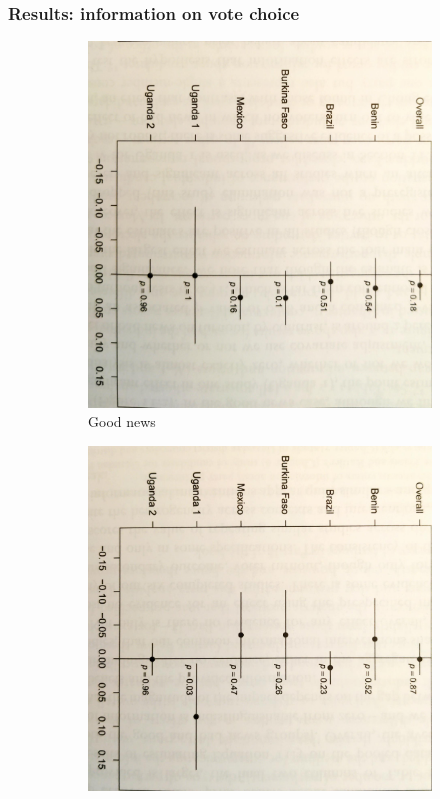 \documentclass[12pt,english,dvipsnames,aspectratio=169,handout]{beamer}\usepackage[]{graphicx}\usepackage[]{xcolor}
\begin{document}
\begin{frame}
\end{frame}


\begin{frame}
	\frametitle{Results: information on vote choice}
	
	\begin{figure}
		\centering
		\begin{subfigure}{0.47\linewidth}
			\includegraphics[scale=0.071,angle=90]{../04-figures/12/04-Good-news-turnout.jpg}
			\caption{Good news}
		\end{subfigure}
		\begin{subfigure}{0.47\linewidth}
			\includegraphics[scale=0.078,angle=90]{../04-figures/12/05-Bad-news-turnout.jpg}

\end{subfigure}
\end{figure}
\end{frame}
\end{document}

